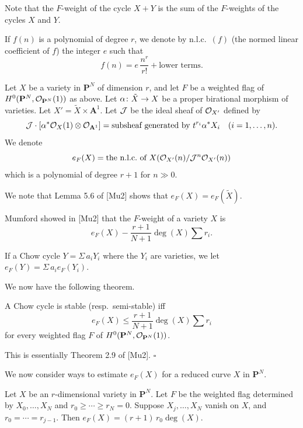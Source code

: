 \documentclass[12pt]{memoir}
\begin{document}
Note that the $F$-weight of the cycle $X + Y$ is the sum of the $F$-weights of the cycles $X$ and $Y$.

If $f(n)$ is a polynomial of degree $r$, we denote by n.l.c.\ $(f)$ (the normed linear coefficient of $f$) the integer $e$ such that
\[
f(n) = e\,\frac{n^r}{r!} + \text{lower terms.}
\]

Let $X$ be a variety in $\mathbf{P}^N$ of dimension $r$, and let $F$ be a weighted flag of $H^0(\mathbf{P}^N, \mathcal{O}_{\mathbf{P}^N}(1))$ as above. Let $\alpha\colon \tilde{X} \to X$ be a proper birational morphism of varieties. Let $X' = \tilde{X} \times \mathbf{A}^1$. Let $\mathcal{J}$ be the ideal sheaf of $\mathcal{O}_{X'}$ defined by
\[
\mathcal{J} \cdot [\alpha^* \mathcal{O}_X(1) \otimes \mathcal{O}_{\mathbf{A}^1}] = \text{subsheaf generated by } t^{r_i} \alpha^* X_i \quad (i = 1, \dots, n).
\]
We denote
\[
e_F(X) = \text{the n.l.c.\ of } X(\mathcal{O}_{X'}(n)/\mathcal{J}^n \mathcal{O}_{X'}(n))
\]
which is a polynomial of degree $r + 1$ for $n \gg 0$.

We note that Lemma 5.6 of [Mu2] shows that $e_F(X) = e_F(\tilde{X})$.

Mumford showed in [Mu2] that the $F$-weight of a variety $X$ is
\[
e_F(X) - \frac{r+1}{N+1}\deg(X) \sum r_i.
\]

If a Chow cycle $Y = \Sigma\, a_i Y_i$ where the $Y_i$ are varieties, we let $e_F(Y) = \Sigma\, a_i e_F(Y_i)$.

We now have the following theorem.

\begin{Th}\label{thm:1.1}
A Chow cycle is stable (resp.\ semi-stable) iff
\[
e_F(X) \leqslant \frac{r+1}{N+1}\deg(X) \sum r_i
\]
for every weighted flag $F$ of $H^0(\mathbf{P}^N, \mathcal{O}_{\mathbf{P}^N}(1))$.
\end{Th}

\begin{ptcbp}
This is essentially Theorem 2.9 of [Mu2]. \hfill$\square$
\end{ptcbp}

We now consider ways to estimate $e_F(X)$ for a reduced curve $X$ in $\mathbf{P}^N$.

\begin{Lem}\label{lem:1.2}
Let $X$ be an $r$-dimensional variety in $\mathbf{P}^N$. Let $F$ be the weighted flag determined by $X_0, \dots, X_N$ and $r_0 \geqslant \cdots \geqslant r_N = 0$. Suppose $X_j, \dots, X_N$ vanish on $X$, and $r_0 = \cdots = r_{j-1}$. Then $e_F(X) = (r+1)\, r_0 \deg(X)$.
\end{Lem}
\end{document}
